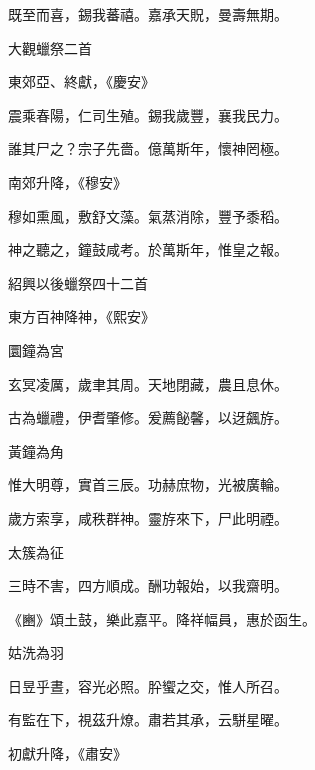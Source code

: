 \begin{pinyinscope}
 既至而喜，錫我蕃禧。嘉承天貺，曼壽無期。



 大觀蠟祭二首



 東郊亞、終獻，《慶安》



 震乘春陽，仁司生殖。錫我歲豐，襄我民力。



 誰其尸之？宗子先嗇。億萬斯年，懷神罔極。



 南郊升降，《穆安》



 穆如熏風，敷舒文藻。氣蒸消除，豐予黍稻。



 神之聽之，鐘鼓咸考。於萬斯年，惟皇之報。



 紹興以後蠟祭四十二首



 東方百神降神，《熙安》



 圜鐘為宮



 玄冥凌厲，歲聿其周。天地閉藏，農且息休。



 古為蠟禮，伊耆肇修。爰薦飶馨，以迓飆斿。



 黃鐘為角



 惟大明尊，實首三辰。功赫庶物，光被廣輪。



 歲方索享，咸秩群神。靈斿來下，尸此明禋。



 太簇為征



 三時不害，四方順成。酬功報始，以我齋明。



 《豳》頌土鼓，樂此嘉平。降祥幅員，惠於函生。



 姑洗為羽



 日昱乎晝，容光必照。肸蠁之交，惟人所召。



 有監在下，視茲升燎。肅若其承，云駢星曜。



 初獻升降，《肅安》




\end{pinyinscope}
